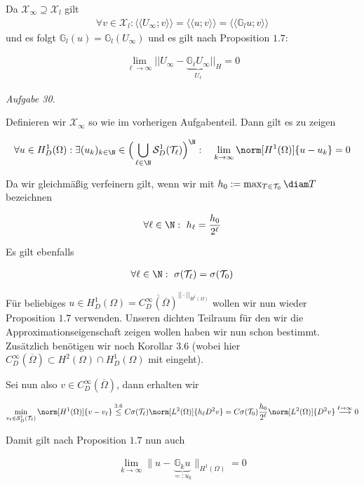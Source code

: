 \begin{solution}
Da $\mathcal{X}_\infty \supseteq \mathcal{X}_l$ gilt
\begin{align*}
  \forall v \in \mathcal{X}_l: \langle \langle U_\infty; v \rangle \rangle =
  \langle \langle u; v \rangle \rangle
  = \langle \langle \mathbb{G}_l u; v \rangle \rangle
\end{align*}
und es folgt $\mathbb{G}_l(u) = \mathbb{G}_l(U_\infty)$ und es gilt nach Proposition $1.7$:

\begin{align*}
  \lim_{\ell \to \infty} ||U_\infty - \underbrace{\mathbb{G}_\ell U_\infty}_{U_\ell}||_H
  =
  0
\end{align*}

\textit{Aufgabe 30.}

Definieren wir $\mathcal{X}_\infty$ so wie im vorherigen Aufgabenteil. Dann gilt es zu zeigen

\begin{align*}
  \forall u \in H^1_D(\Omega):
  \exists (u_k)_{k \in \N} \in \Big(\bigcup_{\ell \in \N} \mathcal{S}^1_D(\mathcal{T}_\ell)\Big)^\N:
  \quad
  \lim_{k \to \infty} \norm[H^1(\Omega)]{u - u_k} = 0
\end{align*}

Da wir gleichmäßig verfeinern gilt, wenn wir mit $h_0 := \max_{T \in \mathcal{T}_0} \diam T$ bezeichnen

\begin{align*}
  \forall \ell \in \N:~
  h_\ell
  =
  \frac{h_0}{2^\ell}
\end{align*}

Es gilt ebenfalls

\begin{align*}
  \forall \ell \in \N:~
  \sigma(\mathcal{T}_\ell) = \sigma(\mathcal{T}_0)
\end{align*}

Für beliebiges $u \in H^1_D(\Omega) = \overline{C^\infty_D(\overline{\Omega})}^{||\cdot||_{H^1(\Omega)}}$ wollen wir nun wieder Proposition $1.7$ verwenden. Unseren dichten Teilraum für den wir die Approximationseigenschaft zeigen wollen haben wir nun schon bestimmt. Zusätzlich benötigen wir noch Korollar $3.6$ (wobei hier $C^\infty_D(\overline{\Omega}) \subset H^2(\Omega) \cap H^1_D(\Omega)$ mit eingeht).


Sei nun also $v \in C^\infty_D(\overline{\Omega})$, dann erhalten wir

\begin{align*}
  \min_{v_\ell \in \mathcal{S}^1_D(\mathcal{T}_\ell)} \norm[H^1(\Omega)]{v - v_\ell}
  \stackrel{3.6}{\leq}
  C \sigma(\mathcal{T}_\ell)\norm[L^2(\Omega)]{h_\ell D^2v}
  =
  C \sigma(\mathcal{T}_0) \frac{h_0}{2^\ell} \norm[L^2(\Omega)]{D^2v}
  \stackrel{\ell \to \infty}{\longrightarrow}
  0
\end{align*}

Damit gilt nach Proposition $1.7$ nun auch

\begin{align*}
  \lim_{k \to \infty} \|u - \underbrace{\mathbb{G}_ku}_{=:u_k}\|_{H^1(\Omega)} = 0
\end{align*}
\end{solution}

